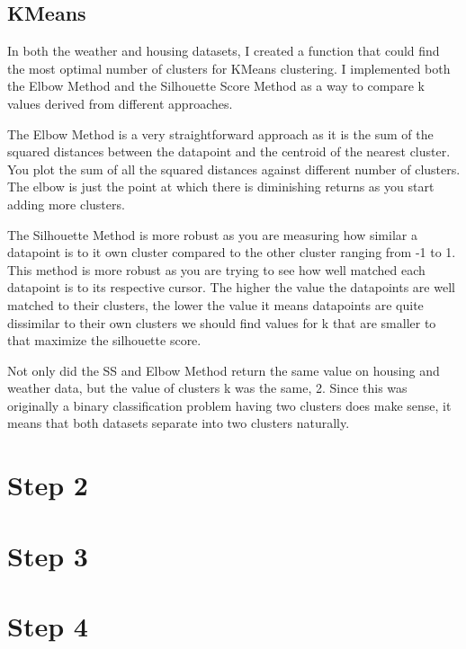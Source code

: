\documentclass[conference]{IEEEtran}
\begin{document}
\subsection{KMeans}
In both the weather and housing datasets, I created a function that could find the most optimal number of clusters for KMeans clustering. I implemented both the Elbow Method and the Silhouette Score Method as a way to compare k values derived from different approaches. 
\par The Elbow Method is a very straightforward approach as it is the sum of the squared distances between the datapoint and the centroid of the nearest cluster. You plot the sum of all the squared distances against different number of clusters. The elbow is just the point at which there is diminishing returns as you start adding more clusters. 
\par The Silhouette Method is more robust as you are measuring how similar a datapoint is to it own cluster compared to the other cluster ranging from -1 to 1. This method is more robust as you are trying to see how well matched each datapoint is to its respective cursor. The higher the value the datapoints are well matched to their clusters, the lower the value it means datapoints are quite dissimilar to their own clusters we should find values for k that are smaller to that maximize the silhouette score. 
\par Not only did the SS and Elbow Method return the same value on housing and weather data, but the value of clusters k was the same, 2. Since this was originally a binary classification problem having two clusters does make sense, it means that both datasets separate into two clusters naturally.

\section{Step 2}
\section{Step 3}
\section{Step 4}
\begin{table}[htp]
    \centering
    \caption{Performance Metrics for PCA, ICA, and RP}
    \label{tab:performance_metrics}
    \resizebox{\columnwidth}{!}{%
    \begin{tabular}{lcccc}
    \toprule
    \textbf{Method} & \textbf{Accuracy} & \textbf{Training Time (s)} & \textbf{Prediction Time (s)} & \textbf{F1-Score Avg} \\
    \midrule
    \textbf{PCA} & 0.9334 & 3.4113 & 0.00041 & 0.93 \\
    \textbf{ICA} & 0.9471 & 2.6668 & 0.00051 & 0.95 \\
    \textbf{RP}  & 0.9181 & 2.1919 & 0.00032 & 0.92 \\
    \bottomrule
    \end{tabular}%
    }
\end{table}
\end{document}
